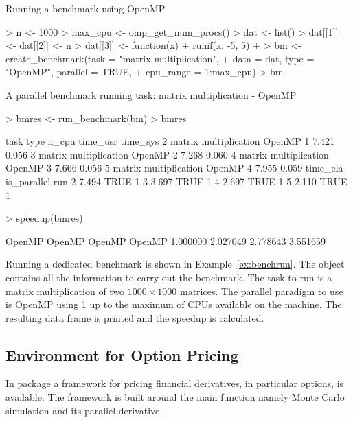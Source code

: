 \begin{Example} Running a benchmark using OpenMP
\label{ex:benchrun}
\begin{Schunk}
\begin{Sinput}
> n <- 1000
> max_cpu <- omp_get_num_procs()
> dat <- list()
> dat[[1]] <- dat[[2]] <- n
> dat[[3]] <- function(x) {
+     runif(x, -5, 5)
+ }
> bm <- create_benchmark(task = "matrix multiplication", 
+     data = dat, type = "OpenMP", parallel = TRUE, 
+     cpu_range = 1:max_cpu)
> bm
\end{Sinput}
\begin{Soutput}
A parallel benchmark running task: matrix multiplication - OpenMP
\end{Soutput}
\begin{Sinput}
> bmres <- run_benchmark(bm)
> bmres
\end{Sinput}
\begin{Soutput}
                   task   type n_cpu time_usr time_sys
2 matrix multiplication OpenMP     1    7.421    0.056
3 matrix multiplication OpenMP     2    7.268    0.060
4 matrix multiplication OpenMP     3    7.666    0.056
5 matrix multiplication OpenMP     4    7.955    0.059
  time_ela is_parallel run
2    7.494        TRUE   1
3    3.697        TRUE   1
4    2.697        TRUE   1
5    2.110        TRUE   1
\end{Soutput}
\begin{Sinput}
> speedup(bmres)
\end{Sinput}
\begin{Soutput}
  OpenMP   OpenMP   OpenMP   OpenMP 
1.000000 2.027049 2.778643 3.551659 
\end{Soutput}
\end{Schunk}
\end{Example}

Running a dedicated benchmark is shown in
Example~\ref{ex:benchrun}. The object  contains all the
information to carry out the benchmark. The task to run is a matrix
multiplication of two $1000 \times 1000$ matrices. The parallel
paradigm to use is OpenMP using 1 up to the maximum of CPUs available
on the machine. The resulting data frame is printed and the speedup is
calculated.

\subsection{Environment for Option Pricing}

In package  a framework for pricing financial derivatives,
in particular options, is available. The framework is built around the
main function namely Monte Carlo simulation and its parallel
derivative. 

